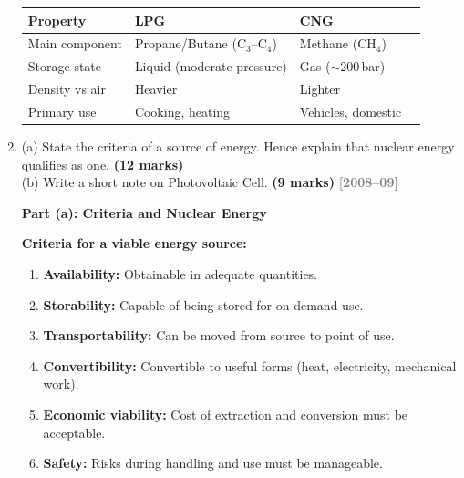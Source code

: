 \documentclass[12pt,a3paper]{article}
\newcommand{\yr}[1]{\hfill\textcolor{gray}{\small\textbf{[#1]}}}
\newcommand{\mk}[1]{\textcolor{orange!70!black}{\small\textbf{(#1 marks)}}}
\begin{document}
\begin{enumerate}
\begin{tcolorbox}[enhanced,breakable,ansbox,colback=cA!4,colframe=cA,
  boxrule=0.8pt,arc=5pt,
  title={\textbf{Answer}},fonttitle=\bfseries\color{white},colbacktitle=cA]
\begin{center}
\small
\begin{tabular}{@{}llll@{}}
\toprule
\textbf{Property} & \textbf{LPG} & \textbf{CNG} \\
\midrule
Main component & Propane/Butane (C$_3$--C$_4$) & Methane (CH$_4$) \\
Storage state  & Liquid (moderate pressure)    & Gas ($\sim$200\,bar) \\
Density vs air & Heavier                       & Lighter \\
Primary use    & Cooking, heating              & Vehicles, domestic \\
\bottomrule
\end{tabular}
\end{center}

\end{tcolorbox}

\item \label{qlabel:A1-Q15}
(a) State the criteria of a source of energy. Hence explain that nuclear energy qualifies as one. \mk{12}\\
(b) Write a short note on Photovoltaic Cell. \mk{9}
\yr{2008--09}

\begin{tcolorbox}[enhanced,breakable,ansbox,colback=cA!4,colframe=cA,
  boxrule=0.8pt,arc=5pt,
  title={\textbf{Answer}},fonttitle=\bfseries\color{white},colbacktitle=cA]

\textbf{Part (a): Criteria and Nuclear Energy}

\textbf{Criteria for a viable energy source:}
\begin{enumerate}[leftmargin=2em,itemsep=2pt]
  \item \textbf{Availability:} Obtainable in adequate quantities.
  \item \textbf{Storability:} Capable of being stored for on-demand use.
  \item \textbf{Transportability:} Can be moved from source to point of use.
  \item \textbf{Convertibility:} Convertible to useful forms (heat, electricity, mechanical work).
  \item \textbf{Economic viability:} Cost of extraction and conversion must be acceptable.
  \item \textbf{Safety:} Risks during handling and use must be manageable.
\end{enumerate}


\end{tcolorbox}
\end{enumerate}
\end{document}
